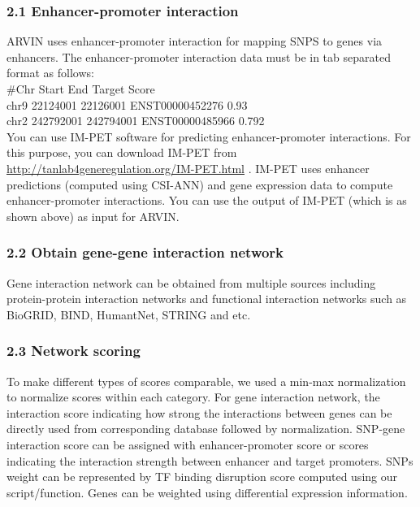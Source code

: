 \documentclass[]{article}
\begin{document}
\subsubsection{2.1 Enhancer-promoter
interaction}\label{enhancer-promoter-interaction}

ARVIN uses enhancer-promoter interaction for mapping SNPS to genes via
enhancers. The enhancer-promoter interaction data must be in tab
separated format as follows:\\
\#Chr Start End Target Score\\
chr9 22124001 22126001 ENST00000452276 0.93\\
chr2 242792001 242794001 ENST00000485966 0.792\\
You can use IM-PET software for predicting enhancer-promoter
interactions. For this purpose, you can download IM-PET from
\url{http://tanlab4generegulation.org/IM-PET.html} . IM-PET uses
enhancer predictions (computed using CSI-ANN) and gene expression data
to compute enhancer-promoter interactions. You can use the output of
IM-PET (which is as shown above) as input for ARVIN.

\subsubsection{2.2 Obtain gene-gene interaction
network}\label{obtain-gene-gene-interaction-network}

Gene interaction network can be obtained from multiple sources including
protein-protein interaction networks and functional interaction networks
such as BioGRID, BIND, HumantNet, STRING and etc.

\subsubsection{2.3 Network scoring}\label{network-scoring}

To make different types of scores comparable, we used a min-max
normalization to normalize scores within each category. For gene
interaction network, the interaction score indicating how strong the
interactions between genes can be directly used from corresponding
database followed by normalization. SNP-gene interaction score can be
assigned with enhancer-promoter score or scores indicating the
interaction strength between enhancer and target promoters. SNPs weight
can be represented by TF binding disruption score computed using our
script/function. Genes can be weighted using differential expression
information.
\end{document}
